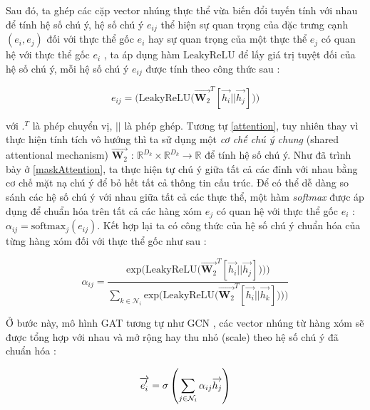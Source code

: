Sau đó, ta ghép các cặp vector nhúng thực thể vừa biến đổi tuyến tính với nhau để tính hệ số chú ý, hệ số chú ý $e_{ij}$ thể hiện sự quan trọng của đặc trưng cạnh $(e_i, e_j)$ đối với thực thể gốc $e_i$ hay sự quan trọng của một thực thể $e_j$ có quan hệ với thực thể gốc $e_i$ , ta áp dụng hàm $\text{LeakyReLU}$ để lấy giá trị tuyệt đối của hệ số chú ý, mỗi hệ số chú ý $e_{ij}$ được tính theo công thức sau :

\begin{equation}
	e_{ij} = \Big( \text{LeakyReLU} \Big( \overrightarrow{\mathbf{W}_{2}}^{T} [\overrightarrow{h_i} || \overrightarrow{h_j}]\Big) \Big)
\end{equation}

với ${.}^{T}$ là phép chuyển vị, $||$ là phép ghép. Tương tự \ref{attention}, tuy nhiên thay vì thực hiện tính tích vô hướng thì ta sử dụng một \textit{cơ chế chú ý chung} (shared attentional mechanism) $\overrightarrow{\mathbf{W}_2}$ : $\mathbb{R}^{D_k} \times \mathbb{R}^{D_k} \xrightarrow{} \mathbb{R}$ để tính hệ số chú ý. Như đã trình bày ở \ref{maskAttention}, ta thực hiện tự chú ý giữa tất cả các đỉnh với nhau bằng cơ chế mặt nạ chú ý để bỏ hết tất cả thông tin cấu trúc.
Để có thể dễ dàng so sánh các hệ số chú ý với nhau giữa tất cả các thực thể, một hàm \textit{softmax} được áp dụng để chuẩn hóa trên tất cả các hàng xóm $e_j$ có quan hệ với thực thể gốc $e_i$ : $\alpha_{ij} = \text{softmax}_j(e_{ij})$. Kết hợp lại ta có công thức của hệ số chú ý chuẩn hóa của từng hàng xóm đối với thực thể gốc như sau :

\begin{equation}
	\label{attentionCoeff}
	\alpha_{ij} = \frac{
		\text{exp} \Big( \text{LeakyReLU} \Big( \overrightarrow{\mathbf{W}_2}^{T} [ \overrightarrow{h_i} || \overrightarrow{h_j}]\Big) \Big))
	}
	{
		\sum_{k \in \mathcal{N}_i}
		\text{exp} \Big( \text{LeakyReLU} \Big( \overrightarrow{\mathbf{W}_2}^{T} [\overrightarrow{h_i} || \overrightarrow{h_k}]\Big) \Big))
	}
\end{equation}

Ở bước này, mô hình GAT tương tự như GCN \cite{kipf2016semi}, các vector nhúng từ hàng xóm sẽ được tổng hợp với nhau và mở rộng hay thu nhỏ (scale) theo hệ số chú ý đã chuẩn hóa :

\begin{equation}
	\label{scaleAttentionCoef}
	\centering
	{\overrightarrow{e'_i}}={\sigma\left(\sum_{j\in \mathcal{N}_i} {\alpha_{ij} \overrightarrow{h_j} }\right)}
\end{equation}

